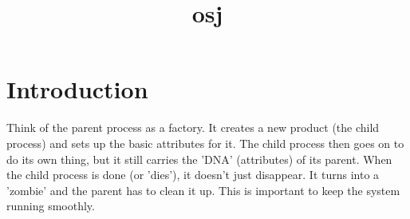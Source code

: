 \documentclass[12pt]{report}
\title{osj}
\author{}
\begin{document}
\maketitle
\tableofcontents
\newpage

\section{Introduction}
\begin{tcolorbox}[     colback=blue!10,     colframe=blue,     title={\fontfamily{lmr}\selectfont \\faComment\ Simple Explanation},     fonttitle=\bfseries,     fontupper=\fontfamily{lmr}\selectfont,     boxrule=1pt,     sharp corners,        ]Think of the parent process as a factory. It creates a new product (the child process) and sets up the basic attributes for it. The child process then goes on to do its own thing, but it still carries the 'DNA' (attributes) of its parent. When the child process is done (or 'dies'), it doesn't just disappear. It turns into a 'zombie' and the parent has to clean it up. This is important to keep the system running smoothly.\end{tcolorbox}
\end{document}
